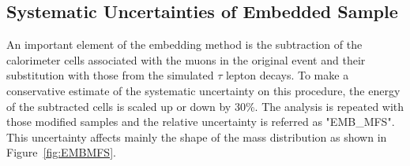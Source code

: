 

%


\subsection{Systematic Uncertainties of  \Ztautau Embedded Sample}\label{sec:embsys}

An important element of the embedding method is the subtraction of the 
calorimeter cells associated with the muons in the original \Zmumu event and their substitution with those from the simulated $\tau$ lepton
decays. To make a conservative estimate of the systematic uncertainty on this procedure, 
the energy of the subtracted cells is scaled up or down by 30\%. The analysis is repeated with those modified 
samples and the relative uncertainty is referred as "EMB\_MFS". This uncertainty affects mainly the shape of the \mmc mass 
distribution as shown in Figure~\ref{fig:EMBMFS}.


